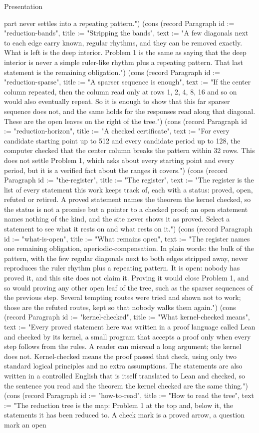 \begin{lexlean}{Presentation}
\begin{semanticmodule}
{part never settles into a repeating pattern."}) (cons (record Paragraph {id := "reduction-bands", title := "Stripping the bands", text := "A few diagonals next to each edge carry known, regular rhythms, and they can be removed exactly. What is left is the deep interior. Problem 1 is the same as saying that the deep interior is never a simple ruler-like rhythm plus a repeating pattern. That last statement is the remaining obligation."}) (cons (record Paragraph {id := "reduction-sparse", title := "A sparser sequence is enough", text := "If the center column repeated, then the column read only at rows 1, 2, 4, 8, 16 and so on would also eventually repeat. So it is enough to show that this far sparser sequence does not, and the same holds for the responses read along that diagonal. These are the open leaves on the right of the tree."}) (cons (record Paragraph {id := "reduction-horizon", title := "A checked certificate", text := "For every candidate starting point up to 512 and every candidate period up to 128, the computer checked that the center column breaks the pattern within 32 rows. This does not settle Problem 1, which asks about every starting point and every period, but it is a verified fact about the ranges it covers."}) (cons (record Paragraph {id := "the-register", title := "The register", text := "The register is the list of every statement this work keeps track of, each with a status: proved, open, refuted or retired. A proved statement names the theorem the kernel checked, so the status is not a promise but a pointer to a checked proof; an open statement names nothing of the kind, and the site never shows it as proved. Select a statement to see what it rests on and what rests on it."}) (cons (record Paragraph {id := "what-is-open", title := "What remains open", text := "The register names one remaining obligation, aperiodic-compensation. In plain words: the bulk of the pattern, with the few regular diagonals next to both edges stripped away, never reproduces the ruler rhythm plus a repeating pattern. It is open: nobody has proved it, and this site does not claim it. Proving it would close Problem 1, and so would proving any other open leaf of the tree, such as the sparser sequences of the previous step. Several tempting routes were tried and shown not to work; those are the refuted routes, kept so that nobody walks them again."}) (cons (record Paragraph {id := "kernel-checked", title := "What kernel-checked means", text := "Every proved statement here was written in a proof language called Lean and checked by its kernel, a small program that accepts a proof only when every step follows from the rules. A reader can misread a long argument; the kernel does not. Kernel-checked means the proof passed that check, using only two standard logical principles and no extra assumptions. The statements are also written in a controlled English that is itself translated to Lean and checked, so the sentence you read and the theorem the kernel checked are the same thing."}) (cons (record Paragraph {id := "how-to-read", title := "How to read the tree", text := "The reduction tree is the map: Problem 1 at the top and, below it, the statements it has been reduced to. A check mark is a proved arrow, a question mark an open }
\end{semanticmodule}
\end{lexlean}
